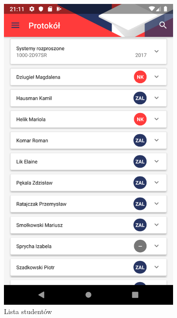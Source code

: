 \documentclass{pracamgr}
\begin{document}
\begin{figure}[p]
	\quad
	\begin{subfigure}[t]{0.3\textwidth}
		\includegraphics[width=\textwidth]{img/protocols_people_list.png}
		\caption{Lista studentów}
		\label{fig:protocols_people_list}
	\end{subfigure}
	\\
	\begin{subfigure}[t]{0.3\textwidth}

\end{subfigure}
\end{figure}
\end{document}
